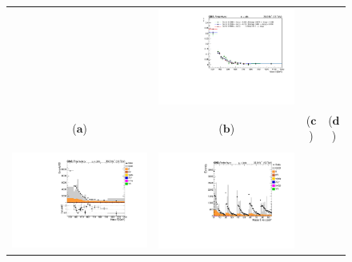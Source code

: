 \begin{figure}[htp]
\begin{tabular}{cccc}
& \hspace{-0.95cm} \includegraphics[scale=0.21]{fig/chapt7/qcd/qcd_e_ch/ttbar_m_3region_compare.pdf}\\
($\mathbf{a}$)\qquad\qquad&($\mathbf{b}$)\qquad\qquad&($\mathbf{c}$)\qquad\qquad&($\mathbf{d}$)\qquad\qquad\\ \\
\hspace{-0.5cm}
\includegraphics[scale=0.22]{fig/chapt7/qcd/qcd_mu_ch/Mass_H_binned43_Inf.pdf}
& \hspace{-1.0cm} \includegraphics[scale=0.225]{fig/chapt7/qcd/qcd_mu_ch/massH_cos_theta43_Inf.pdf}

\end{tabular}
\end{figure}
